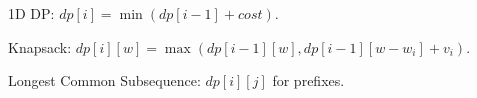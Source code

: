 1D DP: $dp[i] = \min(dp[i-1] + cost)$.

Knapsack: $dp[i][w] = \max(dp[i-1][w], dp[i-1][w-w_i] + v_i)$.

Longest Common Subsequence: $dp[i][j]$ for prefixes.